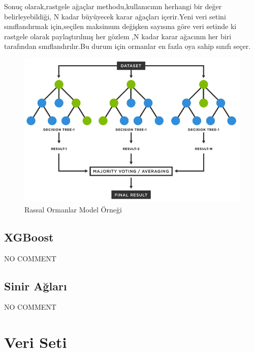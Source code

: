 \documentclass[12pt,twoside]{deuthesis}
\begin{document}
Sonuç olarak,rastgele ağaçlar methodu,kullanıcının herhangi bir değer belirleyebildiği, N kadar büyüyecek karar ağaçları içerir.Yeni veri setini sınıflandırmak için,seçilen maksimum değişken sayısına göre veri setinde ki rastgele olarak paylaştırılmış her gözlem ,N kadar karar ağacının her biri tarafından sınıflandırılır.Bu durum için ormanlar en fazla oya sahip sınıfı seçer.\\
\begin{figure}

{\centering \includegraphics[width=1\linewidth,height=0.5\textheight]{figure/rf_example} 

}

\caption{Rassal Ormanlar Model Örneği}\label{fig:unnamed-chunk-7}
\end{figure}
\hypertarget{xgboost}{%
\section{XGBoost}\label{xgboost}}

NO COMMENT

\hypertarget{nn}{%
\section{Sinir Ağları}\label{nn}}

NO COMMENT

\hypertarget{veri_seti}{%
\chapter{Veri Seti}\label{veri_seti}}
\end{document}
